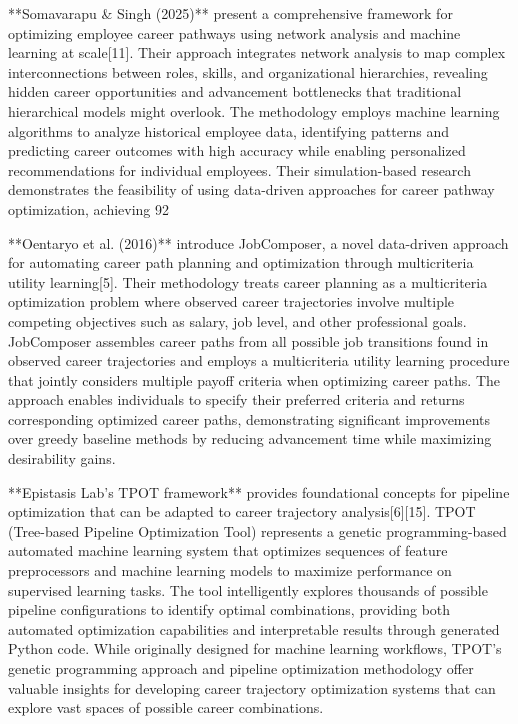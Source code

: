 \documentclass[main.tex]{subfiles}
\begin{document}
**Somavarapu \& Singh (2025)** present a comprehensive framework for optimizing employee career pathways using network analysis and machine learning at scale[11]. Their approach integrates network analysis to map complex interconnections between roles, skills, and organizational hierarchies, revealing hidden career opportunities and advancement bottlenecks that traditional hierarchical models might overlook. The methodology employs machine learning algorithms to analyze historical employee data, identifying patterns and predicting career outcomes with high accuracy while enabling personalized recommendations for individual employees. Their simulation-based research demonstrates the feasibility of using data-driven approaches for career pathway optimization, achieving 92%

**Oentaryo et al. (2016)** introduce JobComposer, a novel data-driven approach for automating career path planning and optimization through multicriteria utility learning[5]. Their methodology treats career planning as a multicriteria optimization problem where observed career trajectories involve multiple competing objectives such as salary, job level, and other professional goals. JobComposer assembles career paths from all possible job transitions found in observed career trajectories and employs a multicriteria utility learning procedure that jointly considers multiple payoff criteria when optimizing career paths. The approach enables individuals to specify their preferred criteria and returns corresponding optimized career paths, demonstrating significant improvements over greedy baseline methods by reducing advancement time while maximizing desirability gains.

**Epistasis Lab's TPOT framework** provides foundational concepts for pipeline optimization that can be adapted to career trajectory analysis[6][15]. TPOT (Tree-based Pipeline Optimization Tool) represents a genetic programming-based automated machine learning system that optimizes sequences of feature preprocessors and machine learning models to maximize performance on supervised learning tasks. The tool intelligently explores thousands of possible pipeline configurations to identify optimal combinations, providing both automated optimization capabilities and interpretable results through generated Python code. While originally designed for machine learning workflows, TPOT's genetic programming approach and pipeline optimization methodology offer valuable insights for developing career trajectory optimization systems that can explore vast spaces of possible career combinations.
\end{document}

